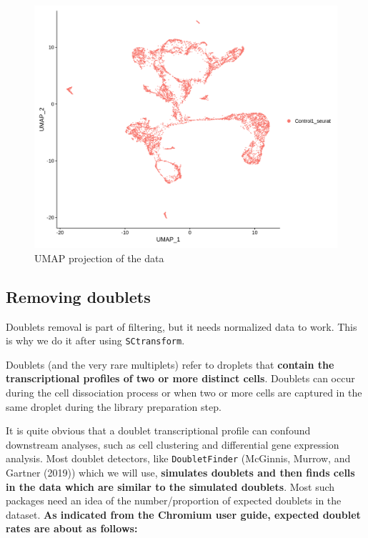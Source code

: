 \documentclass[
  letterpaper,
  DIV=11,
  numbers=noendperiod]{scrartcl}
\begin{document}
\begin{figure}[H]

{\centering \includegraphics{notebook_files/figure-pdf/fig-umap-output-1.png}

}

\caption{\label{fig-umap}UMAP projection of the data}

\end{figure}

\hypertarget{removing-doublets}{%
\subsection{Removing doublets}\label{removing-doublets}}

Doublets removal is part of filtering, but it needs normalized data to
work. This is why we do it after using \texttt{SCtransform}.

Doublets (and the very rare multiplets) refer to droplets that
\textbf{contain the transcriptional profiles of two or more distinct
cells}. Doublets can occur during the cell dissociation process or when
two or more cells are captured in the same droplet during the library
preparation step.

It is quite obvious that a doublet transcriptional profile can confound
downstream analyses, such as cell clustering and differential gene
expression analysis. Most doublet detectors, like \texttt{DoubletFinder}
(McGinnis, Murrow, and Gartner (2019)) which we will use,
\textbf{simulates doublets and then finds cells in the data which are
similar to the simulated doublets}. Most such packages need an idea of
the number/proportion of expected doublets in the dataset. \textbf{As
indicated from the Chromium user guide, expected doublet rates are about
as follows:}
\end{document}
